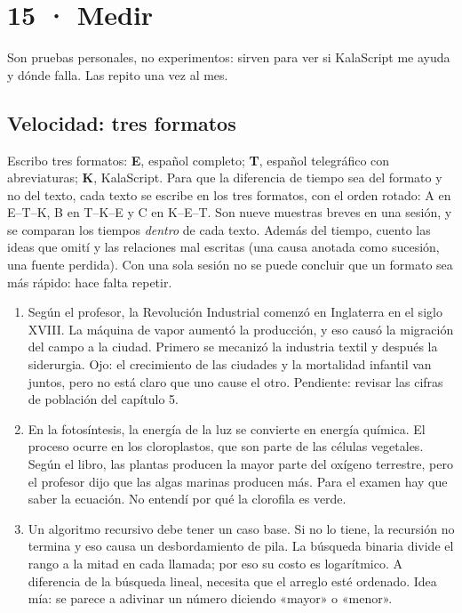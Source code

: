 \documentclass[11pt,a4paper]{article}
\begin{document}
\clearpage
\section*{15 · Medir}
Son pruebas personales, no experimentos: sirven para ver si KalaScript me ayuda
y dónde falla. Las repito una vez al mes.

\subsection*{Velocidad: tres formatos}
Escribo tres formatos: \textbf{E}, español completo; \textbf{T}, español
telegráfico con abreviaturas; \textbf{K}, KalaScript. Para que la diferencia de
tiempo sea del formato y no del texto, cada texto se escribe en los tres
formatos, con el orden rotado: A en E--T--K, B en T--K--E y C en K--E--T. Son
nueve muestras breves en una sesión, y se comparan los tiempos \emph{dentro} de
cada texto. Además del tiempo, cuento las ideas que omití y las relaciones mal
escritas (una causa anotada como sucesión, una fuente perdida). Con una sola
sesión no se puede concluir que un formato sea más rápido: hace falta repetir.
\begin{enumerate}[label=\Alph*.,itemsep=4pt]\small
\item Según el profesor, la Revolución Industrial comenzó en Inglaterra en el siglo
XVIII. La máquina de vapor aumentó la producción, y eso causó la migración del
campo a la ciudad. Primero se mecanizó la industria textil y después la
siderurgia. Ojo: el crecimiento de las ciudades y la mortalidad infantil van
juntos, pero no está claro que uno cause el otro. Pendiente: revisar las cifras
de población del capítulo 5.
\item En la fotosíntesis, la energía de la luz se convierte en energía química.
El proceso ocurre en los cloroplastos, que son parte de las células vegetales.
Según el libro, las plantas producen la mayor parte del oxígeno terrestre, pero
el profesor dijo que las algas marinas producen más. Para el examen hay que saber
la ecuación. No entendí por qué la clorofila es verde.
\item Un algoritmo recursivo debe tener un caso base. Si no lo tiene, la
recursión no termina y eso causa un desbordamiento de pila. La búsqueda binaria
divide el rango a la mitad en cada llamada; por eso su costo es logarítmico. A
diferencia de la búsqueda lineal, necesita que el arreglo esté ordenado. Idea mía:
se parece a adivinar un número diciendo «mayor» o «menor».
\end{enumerate}
\end{document}
